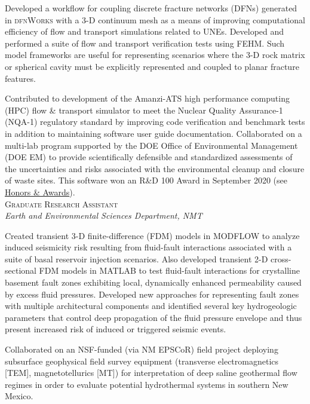 \documentclass[11pt, letterpaper]{article}
\newcommand{\years}[1]{\marginnote{\scriptsize #1}}
\begin{document}
    Developed a workflow for coupling discrete fracture networks (DFNs)
    generated in \textsc{dfnWorks} with a 3-D continuum mesh as a means of
    improving computational efficiency of flow and transport simulations
    related to UNEs.  Developed and performed a suite of flow and transport
    verification tests using FEHM. Such model frameworks are useful for
    representing scenarios where the 3-D rock matrix or spherical cavity must
    be explicitly represented and coupled to planar fracture features.

    Contributed to development of the Amanzi-ATS high performance computing
    (HPC) flow \& transport simulator to meet the Nuclear Quality Assurance-1
    (NQA-1) regulatory standard by improving code verification and benchmark
    tests in addition to maintaining software user guide documentation.
    Collaborated on a multi-lab program supported by the DOE Office of
    Environmental Management (DOE EM) to provide scientifically defensible and
    standardized assessments of the uncertainties and risks associated with the
    environmental cleanup and closure of waste sites. This software won an R\&D
    100 Award in September 2020 (see \hyperref[sec:awards]{Honors \&
    Awards}).\\

\noindent
\years{2016 - 2017}\textsc{Graduate Research Assistant}\\
\textit{Earth and Environmental Sciences Department, NMT}

    \vspace{3pt} \noindent  
    Created transient 3-D finite-difference (FDM) models in MODFLOW to analyze
    induced seismicity risk resulting from fluid-fault interactions associated
    with a suite of basal reservoir injection scenarios. Also developed
    transient 2-D cross-sectional FDM models in MATLAB to test fluid-fault
    interactions for crystalline basement fault zones exhibiting local,
    dynamically enhanced permeability caused by excess fluid pressures. 
    Developed new approaches for representing fault zones with multiple
    architectural components and identified several key hydrogeologic
    parameters that control deep propagation of the fluid pressure envelope and
    thus present increased risk of induced or triggered seismic events.

	Collaborated on an NSF-funded (via NM EPSCoR) field project deploying
	subsurface geophysical field survey equipment (transverse electromagnetics [TEM],
	magnetotellurics [MT]) for interpretation of deep saline geothermal flow
	regimes in order to evaluate potential hydrothermal systems in southern New
	Mexico.\\
\end{document}
